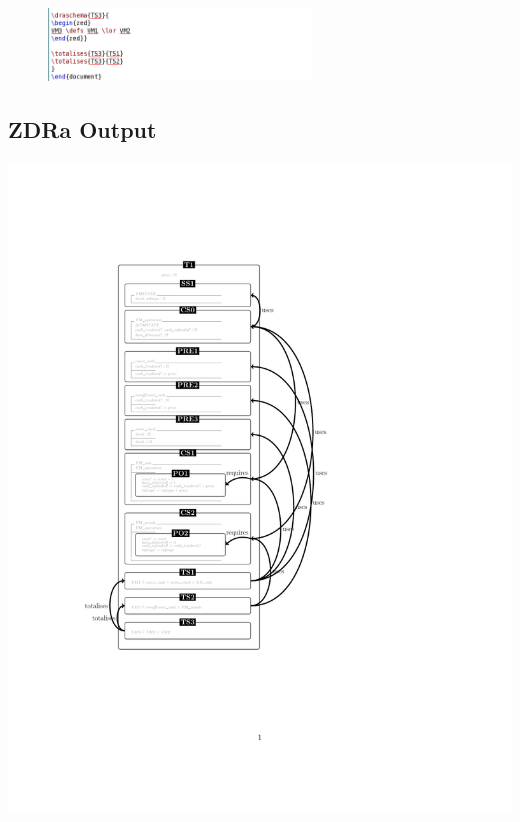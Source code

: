 \begin{figure}[H]
    \includegraphics[width=7cm]{examples/vm/2imagec.png}
\end{figure}


\subsection{ZDRa Output}
\label{app:vm2o}

\includegraphics[clip, trim=3cm 7cm 6cm 4.2cm]{examples/vm/2comp.pdf}

%
